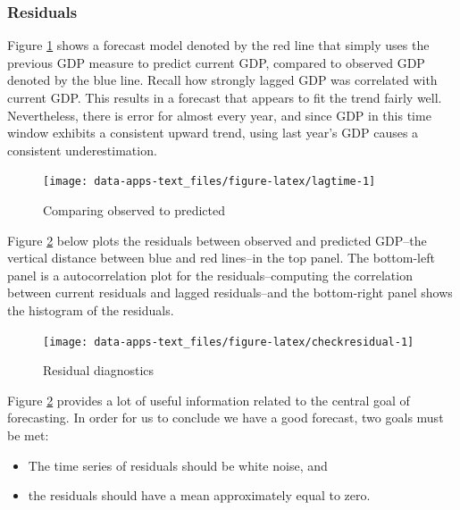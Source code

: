 \documentclass[
]{book}
\providecommand{\tightlist}{%
  \setlength{\itemsep}{0pt}\setlength{\parskip}{0pt}}
\begin{document}
\hypertarget{residuals}{%
\subsubsection*{Residuals}\label{residuals}}

Figure \ref{fig:lagtime} shows a forecast model denoted by the red line that simply uses the previous GDP measure to predict current GDP, compared to observed GDP denoted by the blue line. Recall how strongly lagged GDP was correlated with current GDP. This results in a forecast that appears to fit the trend fairly well. Nevertheless, there is error for almost every year, and since GDP in this time window exhibits a consistent upward trend, using last year's GDP causes a consistent underestimation.

\begin{figure}

{\centering \texttt{[image: data-apps-text\_files/figure-latex/lagtime-1]} 

}

\caption{Comparing observed to predicted}\label{fig:lagtime}
\end{figure}

Figure \ref{fig:checkresidual} below plots the residuals between observed and predicted GDP--the vertical distance between blue and red lines--in the top panel. The bottom-left panel is a autocorrelation plot for the residuals--computing the correlation between current residuals and lagged residuals--and the bottom-right panel shows the histogram of the residuals.

\begin{figure}

{\centering \texttt{[image: data-apps-text\_files/figure-latex/checkresidual-1]} 

}

\caption{Residual diagnostics}\label{fig:checkresidual}
\end{figure}

Figure \ref{fig:checkresidual} provides a lot of useful information related to the central goal of forecasting. In order for us to conclude we have a good forecast, two goals must be met:

\begin{itemize}
\tightlist
\item
  The time series of residuals should be white noise, and
\item
  the residuals should have a mean approximately equal to zero.
\end{itemize}
\end{document}
